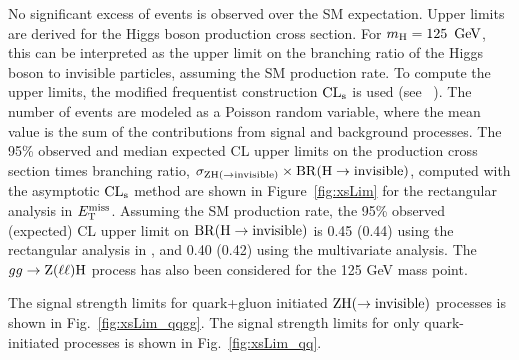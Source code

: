  No significant excess of events is observed over the SM expectation.
 Upper limits are derived for the Higgs boson production cross section.
 For  $m_{\mathrm{H}} = 125~\,\text{Ge\hspace{-.08em}V}$, this can be interpreted as the upper limit on the
 branching ratio of the Higgs boson to invisible particles,
 assuming the SM production rate. 
 To compute the upper limits, the modified frequentist construction 
 $\text{CL}_\text{s}$ is used (see ~\cite{Read1,junkcls,ATLAS:2011tau}).
 The number of events are modeled as a Poisson random variable, 
 where the mean value is the sum of the contributions from signal and background processes. 
 The 95\% observed and median expected CL upper limits on the production cross section times branching ratio, 
 $\sigma_{\mathrm{Z} \mathrm{H}(\to \rm invisible)} \times \mathrm{BR}(\mathrm{H} \to {\rm invisible})$, computed with the asymptotic $\text{CL}_\text{s}$
 method are shown in Figure~\ref{fig:xsLim} for the rectangular analysis in $E_\mathrm{T}^{\mathrm{miss}}$.
 Assuming the SM production rate, the 95\% observed (expected) CL upper limit on $\mathrm{BR}(\mathrm{H} \to {\rm invisible})$ is
0.45 (0.44) using the rectangular analysis in \met, and 0.40 (0.42) using the multivariate analysis. 
The $gg \to \mathrm{Z}(\ell\ell)\mathrm{H}$ process has also been considered for the 125 GeV mass point. 

The signal strength limits for quark+gluon initiated $\mathrm{Z}\mathrm{H}(\to{\rm invisible})$ processes is shown in Fig.~\ref{fig:xsLim_qqgg}.
The signal strength limits for only quark-initiated processes is shown in Fig.~\ref{fig:xsLim_qq}.



